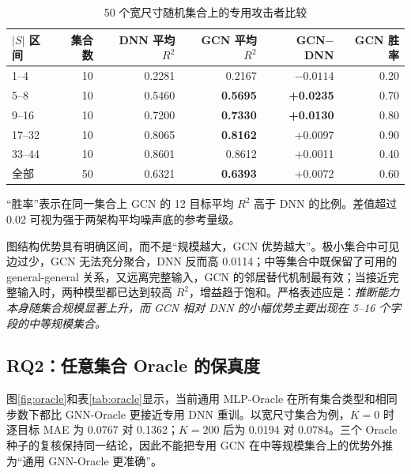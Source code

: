 \documentclass[UTF8,a4paper,zihao=5,fontset=fandol]{ctexart}
\newcommand{\Rtwo}{R^2}
\begin{document}
\begin{table}[H]
  \centering
  \caption{50 个宽尺寸随机集合上的专用攻击者比较}
  \label{tab:attacker}
  \begin{threeparttable}
  \begin{tabular}{@{}lrrrrr@{}}
    \toprule
    $|S|$ 区间 & 集合数 & DNN 平均 $\Rtwo$ & GCN 平均 $\Rtwo$
    & GCN$-$DNN & GCN 胜率\\
    \midrule
    1--4   & 10 & 0.2281 & 0.2167 & $-0.0114$ & 0.20\\
    5--8   & 10 & 0.5460 & \textbf{0.5695} & \textbf{+0.0235} & 0.70\\
    9--16  & 10 & 0.7200 & \textbf{0.7330} & \textbf{+0.0130} & 0.80\\
    17--32 & 10 & 0.8065 & \textbf{0.8162} & +0.0097 & 0.90\\
    33--44 & 10 & 0.8601 & 0.8612 & +0.0011 & 0.40\\
    \midrule
    全部   & 50 & 0.6321 & \textbf{0.6393} & +0.0072 & 0.60\\
    \bottomrule
  \end{tabular}
  \begin{tablenotes}\footnotesize
    \item “胜率”表示在同一集合上 GCN 的 12 目标平均 $\Rtwo$ 高于 DNN 的比例。差值超过 0.02 可视为强于两架构平均噪声底的参考量级。
  \end{tablenotes}
  \end{threeparttable}
\end{table}

图结构优势具有明确区间，而不是“规模越大，GCN 优势越大”。极小集合中可见边过少，GCN 无法充分聚合，DNN 反而高 0.0114；中等集合中既保留了可用的 general-general 关系，又远离完整输入，GCN 的邻居替代机制最有效；当接近完整输入时，两种模型都已达到较高 $\Rtwo$，增益趋于饱和。严格表述应是：\emph{推断能力本身随集合规模显著上升，而 GCN 相对 DNN 的小幅优势主要出现在 5--16 个字段的中等规模集合。}

\subsection{RQ2：任意集合 Oracle 的保真度}

图\ref{fig:oracle}和表\ref{tab:oracle}显示，当前通用 MLP-Oracle 在所有集合类型和相同步数下都比 GNN-Oracle 更接近专用 DNN 重训。以宽尺寸集合为例，$K=0$ 时逐目标 MAE 为 0.0767 对 0.1362；$K=200$ 后为 0.0194 对 0.0784。三个 Oracle 种子的复核保持同一结论，因此不能把专用 GCN 在中等规模集合上的优势外推为“通用 GNN-Oracle 更准确”。
\end{document}
